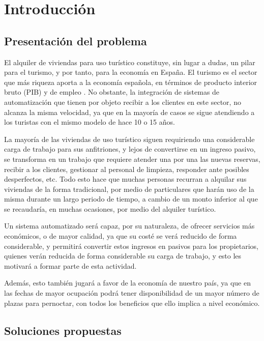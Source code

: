 \chapter{Introducción} 
\label{ch:introduccion}

\section{Presentación del problema} 
\label{sec:presentacion-del-problema}

\noindent El alquiler de viviendas para uso turístico constituye, sin lugar a dudas, un pilar para el turismo, y por tanto, para la economía en España. El turismo es el sector que más riqueza aporta a la economía española, en términos de producto interior bruto (PIB) y de empleo \cite{hosteltur2020}. No obstante, la integración de sistemas de automatización que tienen por objeto recibir a los clientes en este sector, no alcanza la misma velocidad, ya que en la mayoría de casos se sigue atendiendo a los turistas con el mismo modelo de hace 10 o 15 años.

La mayoría de las viviendas de uso turístico siguen requiriendo una considerable carga de trabajo para sus anfitriones, y lejos de convertirse en un ingreso pasivo, se transforma en un trabajo que requiere atender una por una las nuevas reservas, recibir a los clientes, gestionar al personal de limpieza, responder ante posibles desperfectos, etc. Todo esto hace que muchas personas recurran a alquilar sus viviendas de la forma tradicional, por medio de particulares que harán uso de la misma durante un largo periodo de tiempo, a cambio de un monto inferior al que se recaudaría, en muchas ocasiones, por medio del alquiler turístico.

Un sistema automatizado será capaz, por su naturaleza, de ofrecer servicios más económicos, o de mayor calidad, ya que su costé se verá reducido de forma considerable, y permitirá convertir estos ingresos en pasivos para los propietarios, quienes verán reducida de forma considerable su carga de trabajo, y esto les motivará a formar parte de esta actividad.

Además, esto también jugará a favor de la economía de nuestro país, ya que en las fechas de mayor ocupación podrá tener disponibilidad de un mayor número de plazas para pernoctar, con todos los beneficios que ello implica a nivel económico.

\section{Soluciones propuestas} 
\label{sec:soluciones-propuestas}

